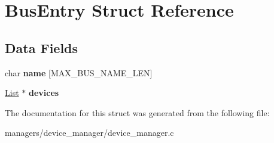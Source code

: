 \hypertarget{structBusEntry}{}\section{Bus\+Entry Struct Reference}
\label{structBusEntry}
\subsection*{Data Fields}
\begin{DoxyCompactItemize}
\item 
char {\bfseries name} \mbox{[}M\+A\+X\+\_\+\+B\+U\+S\+\_\+\+N\+A\+M\+E\+\_\+\+L\+EN\mbox{]}\hypertarget{structBusEntry_ade92828dc8518a2d274b458f9b276cab}{}\label{structBusEntry_ade92828dc8518a2d274b458f9b276cab}

\item 
\hyperlink{structList}{List} $\ast$ {\bfseries devices}\hypertarget{structBusEntry_a1905c0a6142caa2a91c91c312a183b34}{}\label{structBusEntry_a1905c0a6142caa2a91c91c312a183b34}

\end{DoxyCompactItemize}


The documentation for this struct was generated from the following file\+:\begin{DoxyCompactItemize}
\item 
managers/device\+\_\+manager/device\+\_\+manager.\+c\end{DoxyCompactItemize}
